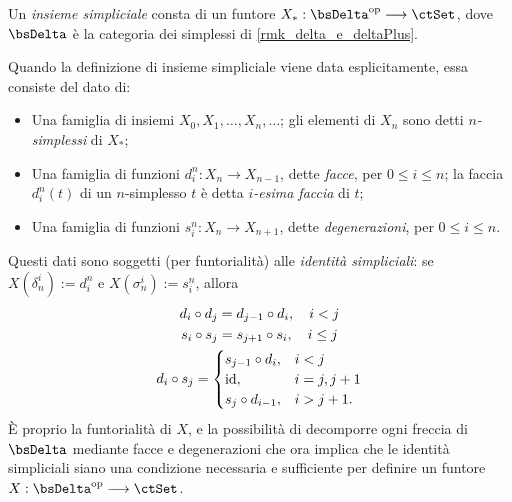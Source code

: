 \begin{definition}\label{def_insieme_simpliciale}
	Un \emph{insieme simpliciale} consta di un funtore \(X_* : \bsDelta^\op\fun\ctSet\), dove \(\bsDelta\) è la categoria dei simplessi di \ref{rmk_delta_e_deltaPlus}.

	Quando la definizione di insieme simpliciale viene data esplicitamente, essa consiste del dato di:
	\begin{itemize}
		\item Una famiglia di insiemi \(X_0,X_1,\dots,X_n,\dots\); gli elementi di \(X_n\) sono detti	\emph{\(n\)-simplessi} di \(X_*\);
		\item Una famiglia di funzioni \(d_i^n : X_n\to X_{n-1}\), dette \emph{facce}, per \(0\leq i\leq n\); la faccia \(d_i^n(t)\) di un \(n\)-simplesso \(t\) è detta \emph{\(i\)-esima faccia} di \(t\);
		\item Una famiglia di funzioni \(s_i^n : X_n\to X_{n+1}\), dette \emph{degenerazioni}, per \(0\leq i\leq n\).
	\end{itemize}
	Questi dati sono soggetti (per funtorialità) alle \emph{identità simpliciali}: se \(X(\delta_n^i) := d_i^n\) e \(X(\sigma_n^i) := s_i^n\), allora
	\begin{gather}
		d_i\circ d_j = d_{j-1}\circ d_i, \quad i < j\label{idsim_1}\\
		s_i \circ s_j = s_{j+1} \circ s_i, \quad i \leq j\label{idsim_2}\\
		d_i\circ s_j =
		\begin{cases}
			s_{j-1}\circ d_i, & i < j      \\
			\mathrm{id},             & i = j, j+1 \\
			s_j\circ d_{i-1}, & i > j+1.
		\end{cases}\label{idsim_3}
	\end{gather}
	\`E proprio la funtorialità di \(X\), e la possibilità di decomporre ogni freccia di \(\bsDelta\) mediante facce e degenerazioni che ora implica che le identità simpliciali siano una condizione necessaria e sufficiente per definire un funtore \(X : \bsDelta^\op\fun\ctSet\).
\end{definition}
